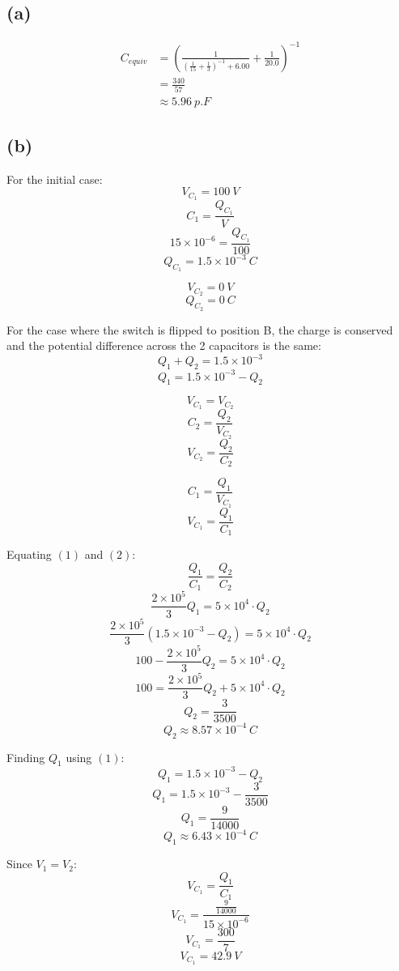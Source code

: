 \documentclass[11pt]{article}
\begin{document}
\subsection{(a)}
\label{sec:org7dc4083}
\begin{align*}
C_{equiv} &= \left( \frac{1}{\left(\frac{1}{15} + \frac{1}{3} \right)^{-1} + 6.00} + \frac{1}{20.0} \right)^{-1} \\
&= \frac{340}{57} \\
&\approx \qty{5.96}{\unit{p.F}}
\end{align*}

\newpage

\subsection{(b)}
\label{sec:orgdf56f83}
For the initial case:
\[V_{C_1} = \qty{100}{\unit{V}}\]
\[C_1 = \frac{Q_{C_1}}{V}\]
\[15 \times 10^{-6} = \frac{Q_{C_1}}{100}\]
\[Q_{C_1} = 1.5 \times 10^{-3} \ \unit{C}\]

\[V_{C_2} = \qty{0}{\unit{V}}\]
\[Q_{C_2} = \qty{0}{\unit{C}}\]

For the case where the switch is flipped to position B, the charge is conserved and the potential difference across the 2 capacitors is the same:
\[Q_1 + Q_2 = 1.5 \times 10^{-3}\]
\[Q_1 = 1.5 \times 10^{-3} - Q_2 \tag{1}\]

\[V_{C_1} = V_{C_2}\]
\[C_2 = \frac{Q_2}{V_{C_2}}\]
\[V_{C_2} = \frac{Q_2}{C_2} \tag{2}\]

\[C_1 = \frac{Q_1}{V_{C_1}}\]
\[V_{C_1} = \frac{Q_1}{C_1} \tag{3}\]

\newpage

Equating \((1)\) and \((2)\):
\[\frac{Q_1}{C_1} = \frac{Q_2}{C_2}\]
\[\frac{2 \times 10^{5}}{3}Q_1 = 5 \times 10^{4} \cdot Q_2\]
\[\frac{2 \times 10^{5}}{3} (1.5 \times 10^{-3} - Q_2) = 5 \times 10^{4} \cdot Q_2\]
\[100 - \frac{2 \times 10^{5}}{3} Q_2 = 5 \times 10^{4} \cdot Q_2\]
\[100 = \frac{2 \times 10^{5}}{3} Q_2 + 5 \times 10^{4} \cdot Q_2\]
\[Q_2 = \frac{3}{3500}\]
\[Q_2 \approx 8.57 \times 10^{-4} \ \unit{C}\]

Finding \(Q_1\) using \((1)\):
\[Q_1 = 1.5 \times 10^{-3} - Q_2\]
\[Q_1 = 1.5 \times 10^{-3} - \frac{3}{3500}\]
\[Q_1 = \frac{9}{14000}\]
\[Q_1 \approx 6.43 \times 10^{-4} \ \unit{C}\]

Since \(V_1 = V_2\):
\[V_{C_1} = \frac{Q_1}{C_1}\]
\[V_{C_1} = \frac{\frac{9}{14000}}{15 \times 10^{-6}}\]
\[V_{C_1} = \frac{300}{7}\]
\[V_{C_1} = \qty{42.9}{\unit{V}}\]
\end{document}
